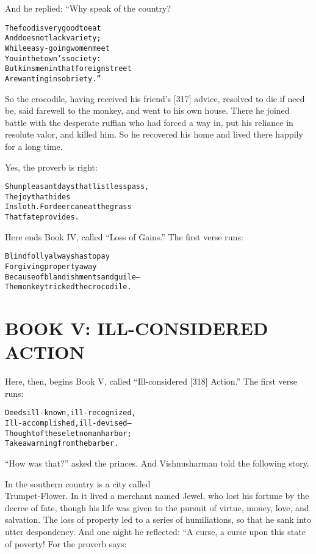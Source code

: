 \documentclass{article}
\renewenvironment{verbatim}{\begin{alltt}\normalfont\begin{centering}}{\end{centering}\end{alltt}}
\begin{document}
And he replied: “Why speak of the country?

\begin{verbatim}
The food is very good to eat
    And does not lack variety;
While easy-going women meet
    You in the town's society:
But kinsmen in that foreign street
    Are wanting in sobriety.”                           
\end{verbatim}
So the crocodile, having received his friend's [317] advice,
resolved to die if need be, said farewell to the monkey, and went
to his own house. There he joined battle with the desperate ruffian
who had forced a way in, put his reliance in resolute valor, and
killed him. So he recovered his home and lived there happily for a
long time.

Yes, the proverb is right:

\begin{verbatim}
Shun pleasant days that listless pass,
    The joy that hides
In sloth. For deer can eat the grass
    That fate provides.                                 
\end{verbatim}
Here ends Book IV, called ``Loss of Gains.'' The first verse runs:

\begin{verbatim}
Blind folly always has to pay
For giving property away
Because of blandishments and guile--
The monkey tricked the crocodile.                       
\end{verbatim}
\section{BOOK V: ILL-CONSIDERED ACTION}

Here, then, begins Book V, called ``Ill-considered [318] Action.''
The first verse runs:

\begin{verbatim}
Deeds ill-known, ill-recognized,
Ill-accomplished, ill-devised--
Thought of these let no man harbor;
Take a warning from the barber.
\end{verbatim}
``How was that?'' asked the princes. And Vishnusharman told the
following story.

In the southern country is a city called\\Trumpet-Flower. In it
lived a merchant named Jewel, who lost his fortune by the decree of
fate, though his life was given to the pursuit of virtue, money,
love, and salvation. The loss of property led to a series of
humiliations, so that he sank into utter despondency. And one night
he reflected: “A curse, a curse upon this state of poverty! For the
proverb says:
\end{document}
